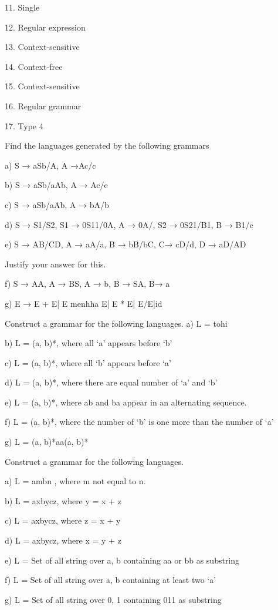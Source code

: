 \documentclass[14pt]{beamer}
\begin{document}
11. Single 



12. Regular expression


13. Context-sensitive 


14. Context-free 


15. Context-sensitive


16. Regular grammar 


17. Type 4 


Find the languages generated by the following grammars


a) S → aSb/A, A →Ac/c
 
 
 b) S → aSb/aAb, A → Ac/e


 c) S → aSb/aAb, A → bA/b
 
 
 d) S → S1/S2, S1 → 0S11/0A, A → 0A/, S2 → 0S21/B1, B → B1/e
 
 
 e) S → AB/CD, A → aA/a, B → bB/bC, C→ cD/d, D → aD/AD
 
 
 Justify your answer for this.
 
 
 f) S → AA, A → BS, A → b, B → SA, B→ a
 
 
 g) E → E + E| E menhha E| E * E| E/E|id
 
 Construct a grammar for the following languages.
a) L = {tohi}
 
 
 b) L = (a, b)*, where all ‘a’ appears before ‘b’
 
 
 c) L = (a, b)*, where all ‘b’ appears before ‘a’
 
 
 d) L = (a, b)*, where there are equal number of ‘a’ and ‘b’
 
 
 e) L = (a, b)*, where ab and ba appear in an alternating sequence.
 
 
 f) L = (a, b)*, where the number of ‘b’ is one more than the number of ‘a’


 g) L = (a, b)*aa(a, b)*


Construct a grammar for the following languages.


a) L = ambn
, where m not equal to n.


 b) L = axbycz, where y = x + z
 
 
 c) L = axbycz, where z = x + y
 
 
 d) L = axbycz, where x = y + z
 
 
 e) L = Set of all string over a, b containing aa or bb as substring
 
 
 f) L = Set of all string over a, b containing at least two ‘a’
 
 
 g) L = Set of all string over 0, 1 containing 011 as substring
 
\end{document}
